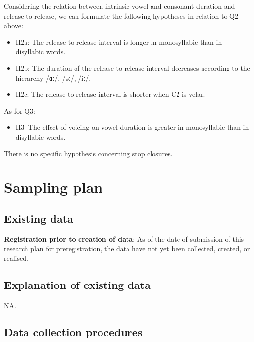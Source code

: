 \documentclass[11pt,]{article}
\providecommand{\tightlist}{%
  \setlength{\itemsep}{0pt}\setlength{\parskip}{0pt}}
\begin{document}
Considering the relation between intrinsic vowel and consonant duration
and release to release, we can formulate the following hypotheses in
relation to Q2 above:

\begin{itemize}
\tightlist
\item
  H2a: The release to release interval is longer in monosyllabic than in
  disyllabic words.
\item
  H2b: The duration of the release to release interval decreases
  according to the hierarchy /ɑː/, /əː/, /iː/.
\item
  H2c: The release to release interval is shorter when C2 is velar.
\end{itemize}

As for Q3:

\begin{itemize}
\tightlist
\item
  H3: The effect of voicing on vowel duration is greater in monosyllabic
  than in disyllabic words.
\end{itemize}

There is no specific hypothesis concerning stop closures.

\hypertarget{sampling-plan}{%
\section{Sampling plan}\label{sampling-plan}}

\hypertarget{existing-data}{%
\subsection{Existing data}\label{existing-data}}

\textbf{Registration prior to creation of data}: As of the date of
submission of this research plan for preregistration, the data have not
yet been collected, created, or realised.

\hypertarget{explanation-of-existing-data}{%
\subsection{Explanation of existing
data}\label{explanation-of-existing-data}}

NA.

\hypertarget{data-collection-procedures}{%
\subsection{Data collection
procedures}\label{data-collection-procedures}}
\end{document}
